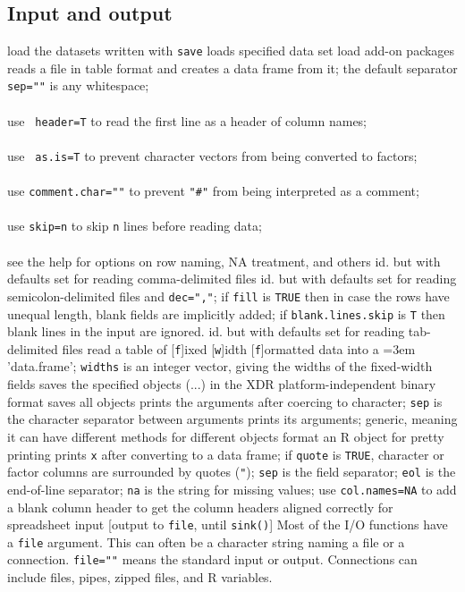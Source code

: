 \subsection{Input and output}{}
	{load the datasets written with {\tt save}}
	{loads specified data set}
	{load add-on packages}
	{reads a file in table format and creates a data frame
    from it; the default separator {\tt sep=""} is any whitespace;\\\\use {\tt
        header=T} to read the first line as a header of column names;\\\\use {\tt
        as.is=T} to prevent character vectors from being converted to factors;\\\\
    use {\tt comment.char=""} to prevent {\tt "\#"} from being interpreted as a
    comment;\\\\use {\tt skip=n} to skip {\tt n} lines before reading data;\\\\see
    the help for options on row naming, NA treatment, and others}
	{id. but with defaults set for reading comma-delimited files}
	{id. but with defaults set for reading semicolon-delimited files and {\tt dec=","}; if {\tt fill} is
{\tt TRUE} then in case the rows have unequal length, blank fields are implicitly added; if {\tt blank.lines.skip} is {\tt T} then blank lines in the input are ignored.}
	{id. but with defaults set for reading tab-delimited files}
	{
    read a table of [{\tt f}]ixed [{\tt w}]idth [{\tt f}]or\-mat\-ted data into a
    \emergencystretch=3em 'data.frame'; {\tt widths} is an integer vector,
    giving the widths of the fixed-width fields}
	{saves the specified objects (...) in the XDR
    platform-independent binary format}
	{saves all objects}
	{prints the arguments after
    coercing to character; {\tt sep} is the character separator between
    arguments}
	{prints its arguments; generic, meaning it can
    have different methods for different objects}
	{format an R object for pretty printing}
	{prints {\tt x} after converting to a data frame; if {\tt quote} is {\tt TRUE}, character or factor columns are surrounded by quotes
    ({\tt "}); {\tt sep} is the field separator; {\tt eol} is the
    end-of-line separator; {\tt na} is the string for missing values;
    use {\tt col.names=NA} to add a blank column header to get the
    column headers aligned correctly for spreadsheet input}
	{[output to {\tt file}, until {\tt sink()}] Most
    of the I/O functions have a {\tt file} argument. This can often be a
    character string naming a file or a connection.  {\tt file=""} means
    the standard input or output. Connections can include files, pipes,
    zipped files, and R variables.}

